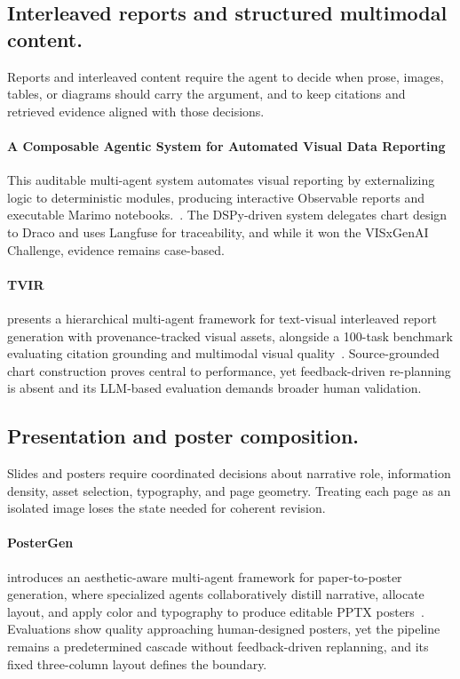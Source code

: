 \subsection{Interleaved reports and structured multimodal content.}
Reports and interleaved content require the agent to decide when prose, images, tables, or diagrams should carry the argument, and to keep citations and retrieved evidence aligned with those decisions.

\paragraph{A Composable Agentic System for Automated Visual Data Reporting}
This auditable multi-agent system automates visual reporting by externalizing logic to deterministic modules, producing interactive Observable reports and executable Marimo notebooks.~\cite{avg250905721}. The DSPy-driven system delegates chart design to Draco and uses Langfuse for traceability, and while it won the VISxGenAI Challenge, evidence remains case-based.

\paragraph{TVIR}
 presents a hierarchical multi-agent framework for text-visual interleaved report generation with provenance-tracked visual assets, alongside a 100-task benchmark evaluating citation grounding and multimodal visual quality~\cite{avg260602320}.  Source-grounded chart construction proves central to performance, yet feedback-driven re-planning is absent and its LLM-based evaluation demands broader human validation.

\subsection{Presentation and poster composition.}
Slides and posters require coordinated decisions about narrative role, information density, asset selection, typography, and page geometry. Treating each page as an isolated image loses the state needed for coherent revision.

\paragraph{PosterGen}
 introduces an aesthetic-aware multi-agent framework for paper-to-poster generation, where specialized agents collaboratively distill narrative, allocate layout, and apply color and typography to produce editable PPTX posters~\cite{avg250817188}. Evaluations show quality approaching human-designed posters, yet the pipeline remains a predetermined cascade without feedback-driven replanning, and its fixed three-column layout defines the boundary.

